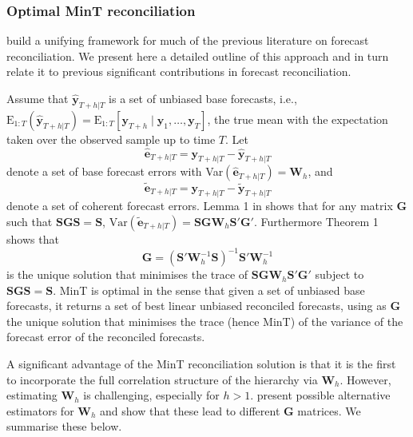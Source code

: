 \documentclass[a4paper, 11pt]{article}
\def\E{\text{E}}
\def\E{\text{E}}
\begin{document}
\subsubsection{Optimal MinT reconciliation}

\citet{WicEtAl2019} build a unifying framework for much of the previous literature on forecast reconciliation. We present here a detailed outline of this approach and in turn relate it to previous significant contributions in forecast reconciliation.

Assume that $\hat{\bm{y}}_{T+h|T}$ is a set of unbiased base forecasts, i.e., $\E_{1:T}(\hat{\bm{y}}_{T+h|T})= \E_{1:T}[\bm{y}_{T+h}\mid\bm{y}_1,\dots,\bm{y}_T]$, the true mean with the expectation taken over the observed sample up to time $T$.
Let
\begin{equation}\label{eq:base errors}
\hat{\bm{e}}_{T+h|T} = \bm{y}_{T+h|T}-\hat{\bm{y}}_{T+h|T}
\end{equation}
denote a set of base forecast errors with Var$(\hat{\bm{e}}_{T+h|T})=\bm{W}_h$, and
\begin{equation*}
\tilde{\bm{e}}_{T+h|T} = \bm{y}_{T+h|T}-\tilde{\bm{y}}_{T+h|T}
\end{equation*} denote a set of coherent forecast errors. Lemma 1 in \citet{WicEtAl2019} shows that for any matrix $\bm{G}$ such that $\bm{S}\bm{G}\bm{S}=\bm{S}$, $\text{Var}(\tilde{\bm{e}}_{T+h|T})=\bm{S}\bm{G}\bm{W}_h\bm{S}'\bm{G}'
$. Furthermore Theorem 1 shows that
\begin{equation} \label{eq:MinT}
\bm{G} = (\bm{S}'{\bm{W}}^{-1}_h\bm{S})^{-1}\bm{S}'{\bm{W}}^{-1}_h
\end{equation}
is the unique solution that minimises the trace of $\bm{S}\bm{G}\bm{W}_h\bm{S}'\bm{G}'$ subject to $\bm{S}\bm{G}\bm{S}=\bm{S}$. MinT is optimal in the sense that given a set of unbiased base forecasts, it returns a set of best linear unbiased reconciled forecasts, using as $\bm{G}$ the unique solution that minimises the trace (hence MinT) of the variance of the forecast error of the reconciled forecasts.

A significant advantage of the MinT reconciliation solution is that it is the first to incorporate the full correlation structure of the hierarchy via $\bm{W}_{h}$. However, estimating $\bm{W}_{h}$ is challenging, especially for $h>1$. \citet{WicEtAl2019} present possible alternative estimators for $\bm{W}_{h}$ and show that these lead to different $\bm{G}$ matrices. We summarise these below.
\end{document}

